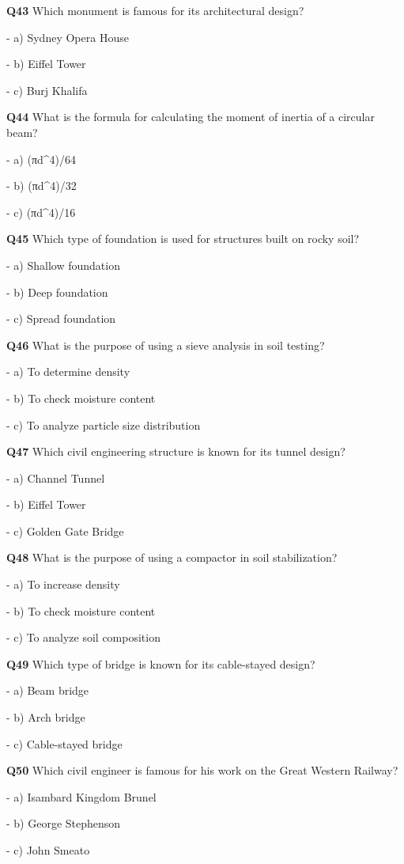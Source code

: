 \textbf{Q43} Which monument is famous for its architectural design?\par
\quad - a) Sydney Opera House\par
\quad - b) Eiffel Tower\par
\quad - c) Burj Khalifa\par

\textbf{Q44} What is the formula for calculating the moment of inertia of a circular beam?\par
\quad - a) (πd^4)/64\par
\quad - b) (πd^4)/32\par
\quad - c) (πd^4)/16\par

\textbf{Q45} Which type of foundation is used for structures built on rocky soil?\par
\quad - a) Shallow foundation\par
\quad - b) Deep foundation\par
\quad - c) Spread foundation\par

\textbf{Q46} What is the purpose of using a sieve analysis in soil testing?\par
\quad - a) To determine density\par
\quad - b) To check moisture content\par
\quad - c) To analyze particle size distribution\par

\textbf{Q47} Which civil engineering structure is known for its tunnel design?\par
\quad - a) Channel Tunnel\par
\quad - b) Eiffel Tower\par
\quad - c) Golden Gate Bridge\par

\textbf{Q48} What is the purpose of using a compactor in soil stabilization?\par
\quad - a) To increase density\par
\quad - b) To check moisture content\par
\quad - c) To analyze soil composition\par

\textbf{Q49} Which type of bridge is known for its cable-stayed design?\par
\quad - a) Beam bridge\par
\quad - b) Arch bridge\par
\quad - c) Cable-stayed bridge\par

\textbf{Q50} Which civil engineer is famous for his work on the Great Western Railway?\par
\quad - a) Isambard Kingdom Brunel\par
\quad - b) George Stephenson\par
\quad - c) John Smeato\par